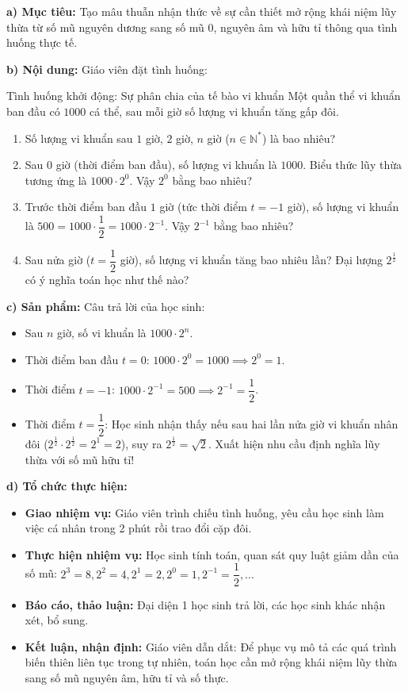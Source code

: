 \documentclass[12pt, a4paper]{article}
\begin{document}
\noindent \textbf{a) Mục tiêu:}
Tạo mâu thuẫn nhận thức về sự cần thiết mở rộng khái niệm lũy thừa từ số mũ nguyên dương sang số mũ $0$, nguyên âm và hữu tỉ thông qua tình huống thực tế.

\noindent \textbf{b) Nội dung:}
Giáo viên đặt tình huống:
\begin{pedabox}{Tình huống khởi động: Sự phân chia của tế bào vi khuẩn}
Một quần thể vi khuẩn ban đầu có $1000$ cá thể, sau mỗi giờ số lượng vi khuẩn tăng gấp đôi.
\begin{enumerate}[leftmargin=0.6cm]
    \item Số lượng vi khuẩn sau $1$ giờ, $2$ giờ, $n$ giờ ($n \in \mathbb{N}^*$) là bao nhiêu?
    \item Sau $0$ giờ (thời điểm ban đầu), số lượng vi khuẩn là $1000$. Biểu thức lũy thừa tương ứng là $1000 \cdot 2^0$. Vậy $2^0$ bằng bao nhiêu?
    \item Trước thời điểm ban đầu $1$ giờ (tức thời điểm $t = -1$ giờ), số lượng vi khuẩn là $500 = 1000 \cdot \dfrac{1}{2} = 1000 \cdot 2^{-1}$. Vậy $2^{-1}$ bằng bao nhiêu?
    \item Sau nửa giờ ($t = \dfrac{1}{2}$ giờ), số lượng vi khuẩn tăng bao nhiêu lần? Đại lượng $2^{\frac{1}{2}}$ có ý nghĩa toán học như thế nào?
\end{enumerate}
\end{pedabox}

\noindent \textbf{c) Sản phẩm:}
Câu trả lời của học sinh:
\begin{itemize}
    \item Sau $n$ giờ, số vi khuẩn là $1000 \cdot 2^n$.
    \item Thời điểm ban đầu $t = 0$: $1000 \cdot 2^0 = 1000 \implies 2^0 = 1$.
    \item Thời điểm $t = -1$: $1000 \cdot 2^{-1} = 500 \implies 2^{-1} = \dfrac{1}{2}$.
    \item Thời điểm $t = \dfrac{1}{2}$: Học sinh nhận thấy nếu sau hai lần nửa giờ vi khuẩn nhân đôi ($2^{\frac{1}{2}} \cdot 2^{\frac{1}{2}} = 2^1 = 2$), suy ra $2^{\frac{1}{2}} = \sqrt{2}$. Xuất hiện nhu cầu định nghĩa lũy thừa với số mũ hữu tỉ!
\end{itemize}

\noindent \textbf{d) Tổ chức thực hiện:}
\begin{itemize}[leftmargin=0.6cm]
    \item \textbf{Giao nhiệm vụ:} Giáo viên trình chiếu tình huống, yêu cầu học sinh làm việc cá nhân trong 2 phút rồi trao đổi cặp đôi.
    \item \textbf{Thực hiện nhiệm vụ:} Học sinh tính toán, quan sát quy luật giảm dần của số mũ: $2^3 = 8, 2^2 = 4, 2^1 = 2, 2^0 = 1, 2^{-1} = \dfrac{1}{2}, \dots$
    \item \textbf{Báo cáo, thảo luận:} Đại diện 1 học sinh trả lời, các học sinh khác nhận xét, bổ sung.
    \item \textbf{Kết luận, nhận định:} Giáo viên dẫn dắt: Để phục vụ mô tả các quá trình biến thiên liên tục trong tự nhiên, toán học cần mở rộng khái niệm lũy thừa sang số mũ nguyên âm, hữu tỉ và số thực.
\end{itemize}
\end{document}
